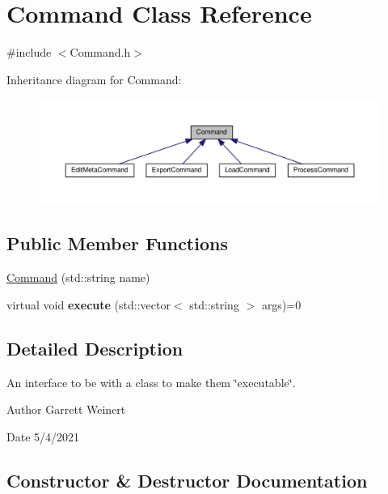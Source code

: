 \hypertarget{classCommand}{}\section{Command Class Reference}
\label{classCommand}


{\ttfamily \#include $<$Command.\+h$>$}



Inheritance diagram for Command\+:
\nopagebreak
\begin{figure}[H]
\begin{center}
\leavevmode
\includegraphics[width=350pt]{da/d5e/classCommand__inherit__graph}
\end{center}
\end{figure}
\subsection*{Public Member Functions}
\begin{DoxyCompactItemize}
\item 
\hyperlink{classCommand_a14139b6d8df5b46a07cf1cdc990c8ec3}{Command} (std\+::string name)
\item 
\mbox{\label{classCommand_a5914e93f56b0de850e6443314b771f50}} 
virtual void {\bfseries execute} (std\+::vector$<$ std\+::string $>$ args)=0
\end{DoxyCompactItemize}


\subsection{Detailed Description}
An interface to be with a class to make them \char`\"{}executable\char`\"{}. \begin{DoxyAuthor}{Author}
Garrett Weinert 
\end{DoxyAuthor}
\begin{DoxyDate}{Date}
5/4/2021 
\end{DoxyDate}


\subsection{Constructor \& Destructor Documentation}
\mbox{\label{classCommand_a14139b6d8df5b46a07cf1cdc990c8ec3}} 
